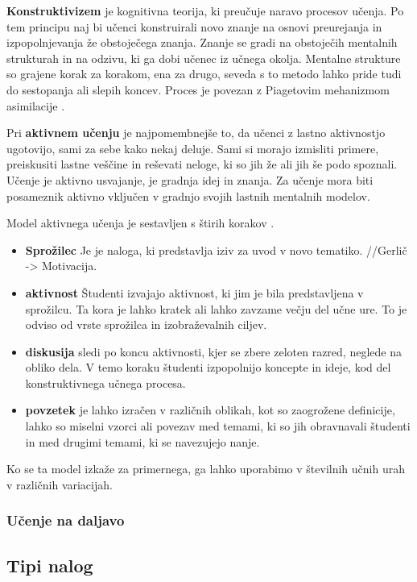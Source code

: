 \textbf{Konstruktivizem} je kognitivna teorija, ki preučuje naravo
procesov učenja. Po tem principu naj bi učenci konstruirali novo
znanje na osnovi preurejanja in izpopolnjevanja že obstoječega
znanja. Znanje se gradi na obstoječih mentalnih strukturah in na
odzivu, ki ga dobi učenec iz učnega okolja. Mentalne strukture so
grajene korak za korakom, ena za drugo, seveda s to metodo lahko pride
tudi do sestopanja ali slepih koncev. Proces je povezan z Piagetovim
mehanizmom asimilacije \cite{guideTCS}.

Pri \textbf{aktivnem učenju} je najpomembnejše to, da učenci z lastno
aktivnostjo ugotovijo, sami za sebe kako nekaj deluje. Sami si morajo
izmisliti primere, preiskusiti lastne veščine in reševati neloge, ki
so jih že ali jih še podo spoznali. Učenje je aktivno usvajanje, je
gradnja idej in znanja. Za učenje mora biti posameznik aktivno
vključen v gradnjo svojih lastnih mentalnih modelov.

Model aktivnega učenja je sestavljen s štirih korakov \cite{guideTCS}.

\begin{itemize}
\item \textbf{Sprožilec} Je je naloga, ki predstavlja  iziv za uvod v novo
tematiko.  //Gerlič -> Motivacija.
\item \textbf{aktivnost} Študenti izvajajo aktivnost, ki jim je bila
predstavljena v sprožilcu. Ta kora je lahko kratek ali lahko
zavzame večju del učne ure. To je odviso od vrste sprožilca in
izobraževalnih ciljev.
\item \textbf{diskusija} sledi po koncu aktivnosti, kjer se zbere zeloten
razred, neglede na obliko dela. V temo koraku študenti izpopolnijo
koncepte in ideje, kod del konstruktivnega učnega procesa.
\item \textbf{povzetek} je lahko izračen v različnih oblikah, kot so
zaogrožene definicije, lahko so miselni vzorci ali povezav med
temami, ki so jih obravnavali študenti in med drugimi temami, ki se
navezujejo nanje.
\end{itemize}

Ko se ta model izkaže za primernega, ga lahko uporabimo v številnih
učnih urah v različnih variacijah.

\subsubsection{Učenje  na daljavo}
\label{sec:Učenje_na_daljavo}


\subsection{Tipi nalog}
\label{tipi_nalog}

